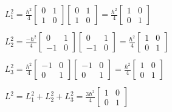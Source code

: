 \begin{equation}
  \begin{array}{c}
  L_1^2 = \frac{\hbar^2}{4}
  \left[
  \begin{matrix}
    0 & 1\\
    1 & 0
  \end{matrix}\right]
  \left[
    \begin{matrix}
      0 & 1\\
      1 & 0
    \end{matrix}\right] =
  \frac{\hbar^2}{4} \left[\begin{matrix}
  1 & 0\\
  0 & 1
  \end{matrix}
  \right]
  \\

  \\
  L_2^2 = \frac{-\hbar^2}{4} \left[
    \begin{matrix}
      0 & 1\\
      -1 & 0
    \end{matrix}\right]\left[\begin{matrix}
      0 & 1\\
      -1 & 0
    \end{matrix}
  \right] =
  \frac{\hbar^2}{4} \left[
    \begin{matrix}
      1 & 0\\
      0 & 1
    \end{matrix}
  \right]
  \\

  \\
  L_3^2 = \frac{\hbar^2}{4}
  \left[\begin{matrix}
    -1 & 0\\
    0 & 1
  \end{matrix}\right]\left[\begin{matrix}
    -1 & 0\\
    0 & 1
  \end{matrix}\right] =
  \frac{\hbar^2}{4}
  \left[\begin{matrix}
    1 & 0\\
    0 & 1
  \end{matrix}\right]
  \\

  \\
  L^2 = L_1^2 + L_2^2 + L_3^2 = \frac{3\hbar^2}{4}\left[\begin{matrix}
    1 & 0\\
    0 & 1
  \end{matrix}\right]
  \end{array}
\end{equation}


